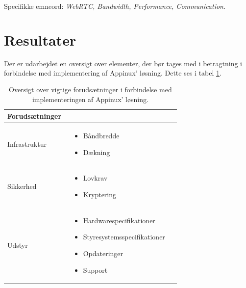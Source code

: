 Specifikke emneord: \textit{WebRTC, Bandwidth, Performance, Communication.}

\section{Resultater}
Der er udarbejdet en oversigt over elementer, der bør tages med i betragtning i forbindelse med implementering af Appinux' løsning. Dette ses i tabel \ref{tab:tabelforud}.
\begin{table}[H]
\caption{Oversigt over vigtige forudsætninger i forbindelse med implementeringen af Appinux' løsning.}
\centering
\label{tab:tabelforud}
\begin{tabular}{|p{0.2\linewidth}m{0.5\linewidth}|}
\hline
\textbf{Forudsætninger} & \\ \hline
Infrastruktur & \begin{itemize}\item Båndbredde\item Dækning \end{itemize}\\ \hline
Sikkerhed & \begin{itemize}\item Lovkrav\item Kryptering \end{itemize}\\ \hline
Udstyr & \begin{itemize}\item Hardwarespecifikationer \item Styresystemsspecifikationer \item Opdateringer \item Support \end{itemize}\\ \hline
\end{tabular}

\end{table}
